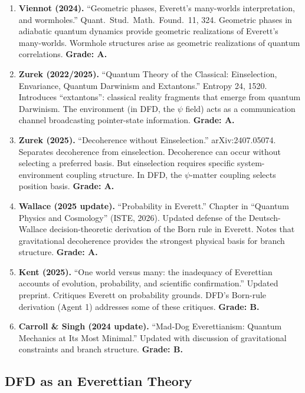 \documentclass[11pt,a4paper]{article}
\begin{document}
\begin{enumerate}
\item \textbf{Viennot (2024).} ``Geometric phases, Everett's many-worlds interpretation, and wormholes.'' Quant.\ Stud.\ Math.\ Found.\ 11, 324. Geometric phases in adiabatic quantum dynamics provide geometric realizations of Everett's many-worlds. Wormhole structures arise as geometric realizations of quantum correlations. \textbf{Grade: A.}

\item \textbf{Zurek (2022/2025).} ``Quantum Theory of the Classical: Einselection, Envariance, Quantum Darwinism and Extantons.'' Entropy 24, 1520. Introduces ``extantons'': classical reality fragments that emerge from quantum Darwinism. The environment (in DFD, the $\psi$ field) acts as a communication channel broadcasting pointer-state information. \textbf{Grade: A.}

\item \textbf{Zurek (2025).} ``Decoherence without Einselection.'' arXiv:2407.05074. Separates decoherence from einselection. Decoherence can occur without selecting a preferred basis. But einselection requires specific system-environment coupling structure. In DFD, the $\psi$-matter coupling selects position basis. \textbf{Grade: A.}

\item \textbf{Wallace (2025 update).} ``Probability in Everett.'' Chapter in ``Quantum Physics and Cosmology'' (ISTE, 2026). Updated defense of the Deutsch-Wallace decision-theoretic derivation of the Born rule in Everett. Notes that gravitational decoherence provides the strongest physical basis for branch structure. \textbf{Grade: A.}

\item \textbf{Kent (2025).} ``One world versus many: the inadequacy of Everettian accounts of evolution, probability, and scientific confirmation.'' Updated preprint. Critiques Everett on probability grounds. DFD's Born-rule derivation (Agent 1) addresses some of these critiques. \textbf{Grade: B.}

\item \textbf{Carroll \& Singh (2024 update).} ``Mad-Dog Everettianism: Quantum Mechanics at Its Most Minimal.'' Updated with discussion of gravitational constraints and branch structure. \textbf{Grade: B.}
\end{enumerate}

\subsection{DFD as an Everettian Theory}
\end{document}
